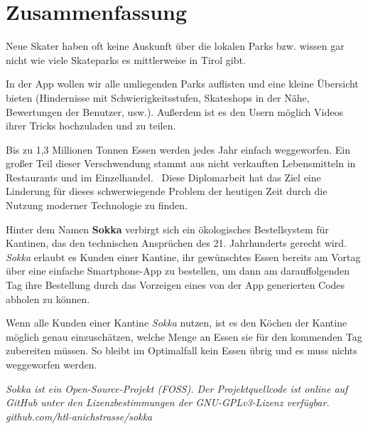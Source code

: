 \section*{Zusammenfassung}

Neue Skater haben oft keine Auskunft über die lokalen Parks bzw. wissen gar nicht wie viele
Skateparks es mittlerweise in Tirol gibt.


In der App wollen wir alle umliegenden Parks auflisten und eine kleine
Übersicht bieten (Hindernisse mit Schwierigkeitsstufen, Skateshops in der Nähe, Bewertungen der
Benutzer, usw.). Außerdem ist es den Usern möglich Videos ihrer Tricks hochzuladen und zu teilen.

Bis zu 1,3 Millionen Tonnen Essen werden jedes Jahr einfach weggeworfen. Ein großer Teil dieser Verschwendung stammt aus nicht verkauften Lebensmitteln in Restaurants und im Einzelhandel.~\cite{depta2018} Diese Diplomarbeit hat das Ziel eine Linderung für dieses schwerwiegende Problem der heutigen Zeit durch die Nutzung moderner Technologie zu finden.

Hinter dem Namen \textbf{Sokka} verbirgt sich ein ökologisches Bestellsystem für Kantinen, das den technischen Ansprüchen des 21. Jahrhunderts gerecht wird. \textit{Sokka} erlaubt es Kunden einer Kantine, ihr gewünschtes Essen bereits am Vortag über eine einfache Smartphone-App zu bestellen, um dann am darauffolgenden Tag ihre Bestellung durch das Vorzeigen eines von der App generierten Codes abholen zu können.

Wenn alle Kunden einer Kantine \textit{Sokka} nutzen, ist es den Köchen der Kantine möglich genau einzuschätzen, welche Menge an Essen sie für den kommenden Tag zubereiten müssen. So bleibt im Optimalfall kein Essen übrig und es muss nichts weggeworfen werden.

\textit{Sokka ist ein Open-Source-Projekt (FOSS). Der Projektquellcode ist online auf GitHub unter den Lizenzbestimmungen der GNU-GPLv3-Lizenz verfügbar.\\github.com/htl-anichstrasse/sokka}

\newpage